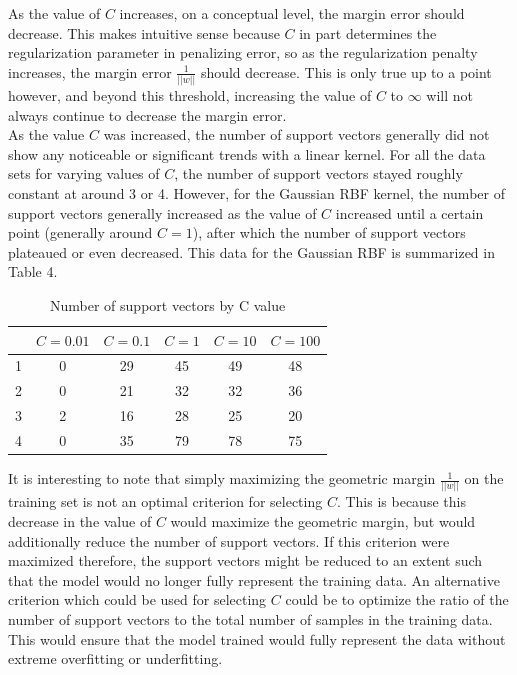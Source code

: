 \documentclass{article}
\begin{document}
As the value of $C$ increases, on a conceptual level, the margin error should decrease. This makes intuitive sense because $C$ in part determines the regularization parameter in penalizing error, so as the regularization penalty increases, the margin error $\frac{1}{||w||}$ should decrease. This is only true up to a point however, and beyond this threshold, increasing the value of $C$ to $\infty$ will not always continue to decrease the margin error. \\

As the value $C$ was increased, the number of support vectors generally did not show any noticeable or significant trends with a linear kernel. For all the data sets for varying values of $C$, the number of support vectors stayed roughly constant at around 3 or 4. However, for the Gaussian RBF kernel, the number of support vectors generally increased as the value of $C$ increased until a certain point (generally around $C=1$), after which the number of support vectors plateaued or even decreased. This data for the Gaussian RBF is summarized in Table 4.

\begin{table}
  \begin{center}
    \begin{tabular}{ | c | c | c | c | c | c | }
      \hline
              & $C=0.01$ & $C=0.1$ & $C=1$ & $C=10$ & $C=100$ \\ \hline
      1       & 0        & 29      & 45    & 49     & 48      \\ \hline
      2       & 0        & 21      & 32    & 32     & 36      \\ \hline
      3       & 2        & 16      & 28    & 25     & 20      \\ \hline
      4       & 0        & 35      & 79    & 78     & 75      \\ \hline
    \end{tabular}
  \end{center}
  \caption{Number of support vectors by C value}
\end{table}

It is interesting to note that simply maximizing the geometric margin $\frac{1}{||w||}$ on the training set is not an optimal criterion for selecting $C$. This is because this decrease in the value of $C$ would maximize the geometric margin, but would additionally reduce the number of support vectors. If this criterion were maximized therefore, the support vectors might be reduced to an extent such that the model would no longer fully represent the training data. An alternative criterion which could be used for selecting $C$ could be to optimize the ratio of the number of support vectors to the total number of samples in the training data. This would ensure that the model trained would fully represent the data without extreme overfitting or underfitting.
\end{document}
